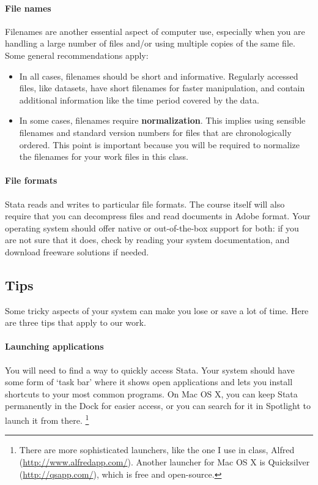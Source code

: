 \paragraph{File names}%
%
Filenames are another essential aspect of computer use, especially when you are handling a large number of files and/or using multiple copies of the same file. Some general recommendations apply:

\begin{itemize}
	\item In all cases, filenames should be short and informative. Regularly accessed files, like datasets, have short filenames for faster manipulation, and contain additional information like the time period covered by the data.
	
	\item In some cases, filenames require \textbf{normalization}. This implies using sensible filenames and standard version numbers for files that are chronologically ordered. This point is important because you will be required to normalize the filenames for your work files in this class. %
\end{itemize}


\paragraph{File formats}%
%
Stata reads and writes to particular file formats. The course itself will also require that you can decompress \ZIP files and read documents in Adobe \PDF format. Your operating system should offer native or out-of-the-box support for both: if you are not sure that it does, check by reading your system documentation, and download freeware solutions if needed.


%
%
\subsection{Tips}

Some tricky aspects of your system can make you lose or save a lot of time. Here are three tips that apply to our work.


\paragraph{Launching applications}%
%
You will need to find a way to quickly access Stata. Your system should have some form of `task bar' where it shows open applications and lets you install shortcuts to your most common programs. On Mac OS X, you can keep Stata permanently in the Dock for easier access, or you can search for it in Spotlight to launch it from there.%
  \footnote{There are more sophisticated launchers, like the one I use in class, Alfred (\url{http://www.alfredapp.com/}). Another launcher for Mac OS X is Quicksilver (\url{http://qsapp.com/}), which is free and open-source.}%


